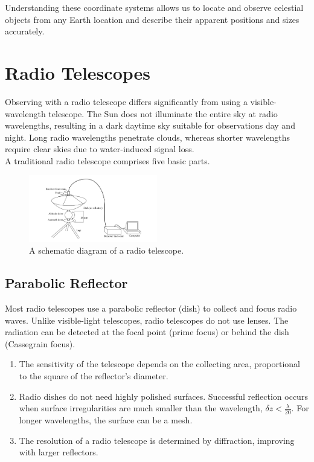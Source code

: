 Understanding these coordinate systems allows us to locate and observe celestial objects from any Earth location and describe their apparent positions and sizes accurately.


\clearpage

\section{Radio Telescopes}

Observing with a radio telescope differs significantly from using a visible-wavelength telescope. The Sun does not illuminate the entire sky at radio wavelengths, resulting in a dark daytime sky suitable for observations day and night. Long radio wavelengths penetrate clouds, whereas shorter wavelengths require clear skies due to water-induced signal loss. \\

A traditional radio telescope comprises five basic parts.

\begin{figure}[H]
    \centering
    \includegraphics[width=0.5\textwidth]{Images/radio_telescope.png}
    \caption{A schematic diagram of a radio telescope.}
    \label{fig:radio_telescope}
\end{figure}

\subsection{Parabolic Reflector}
Most radio telescopes use a parabolic reflector (dish) to collect and focus radio waves. Unlike visible-light telescopes, radio telescopes do not use lenses. The radiation can be detected at the focal point (prime focus) or behind the dish (Cassegrain focus).

\begin{enumerate}
    \item The sensitivity of the telescope depends on the collecting area, proportional to the square of the reflector's diameter.
    \item Radio dishes do not need highly polished surfaces. Successful reflection occurs when surface irregularities are much smaller than the wavelength, \(\delta z < \frac{\lambda}{20}\). For longer wavelengths, the surface can be a mesh.
    \item The resolution of a radio telescope is determined by diffraction, improving with larger reflectors.
\end{enumerate}

